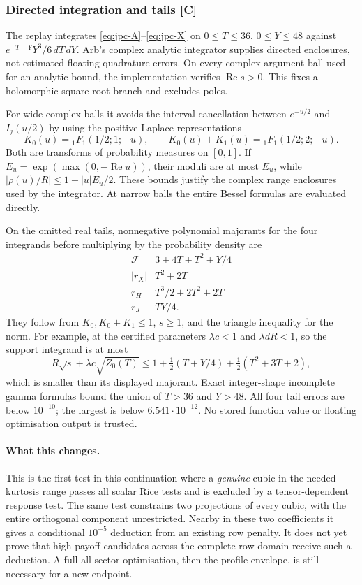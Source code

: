 \subsubsection{Directed integration and tails [C]}
The replay integrates \eqref{eq:jpc-A}--\eqref{eq:jpc-X} on
$0\le T\le36$, $0\le Y\le48$ against
$e^{-T-Y}Y^3/6\,dT\,dY$.
Arb's complex analytic integrator supplies directed enclosures, not
estimated floating quadrature errors. On every complex argument ball
used for an analytic bound, the implementation verifies $\operatorname{Re}s>0$.
This fixes a holomorphic square-root branch and excludes poles.

For wide complex balls it avoids the interval cancellation between
$e^{-u/2}$ and $I_j(u/2)$ by using the positive Laplace representations
\[
 K_0(u)={}_1F_1(1/2;1;-u),\qquad
 K_0(u)+K_1(u)={}_1F_1(1/2;2;-u).
\]
Both are transforms of probability measures on $[0,1]$. If
$E_u=\exp(\max(0,-\operatorname{Re}u))$, their moduli are at most
$E_u$, while
$|\rho(u)/R|\le1+|u|E_u/2$.
These bounds justify the complex range enclosures used by the integrator.
At narrow balls the entire Bessel formulas are evaluated directly.

On the omitted real tails, nonnegative polynomial majorants for the
four integrands before multiplying by the probability density are
\[
\begin{array}{c|c}
 \mathcal F&3+4T+T^2+Y/4\\
 |r_X|&T^2+2T\\
 r_H&T^3/2+2T^2+2T\\
 r_J&TY/4.
\end{array}
\]
They follow from $K_0,K_0+K_1\le1$, $s\ge1$, and the triangle
inequality for the norm. For example, at the certified parameters
$\lambda c<1$ and $\lambda dR<1$, so the support integrand is at most
\[
 R\sqrt s+\lambda c\sqrt{Z_0(T)}
 \le 1+\tfrac12(T+Y/4)+\tfrac12(T^2+3T+2),
\]
which is smaller than its displayed majorant.
Exact integer-shape incomplete gamma formulas
bound the union of $T>36$ and $Y>48$. All four tail errors are below
$10^{-10}$; the largest is below $6.541\cdot10^{-12}$.
No stored function value or floating optimisation output is trusted.

\paragraph{What this changes.}
This is the first test in this continuation where a \emph{genuine}
cubic in the needed kurtosis range passes all scalar Rice tests and
is excluded by a tensor-dependent response test. The same test constrains
two projections of every cubic, with the entire orthogonal component
unrestricted. Nearby in these two coefficients it gives a conditional
$10^{-5}$ deduction from an existing row penalty.
It does not yet prove that high-payoff candidates across the complete
row domain receive such a deduction. A full all-sector optimisation,
then the profile envelope, is still necessary for a new endpoint.

